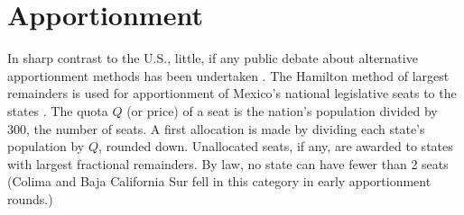 \documentclass[letter,12pt]{article}
\begin{document}
\section{Apportionment}

In sharp contrast to the U.S., little, if any public debate about alternative apportionment methods has been undertaken \citep{szpiro.numbersRule.2010,balinski.rodriguez.1996}. The Hamilton method of largest remainders is used for apportionment of Mexico's national legislative seats to the states \citep[][:10]{balinskiYoung2001FairRep}. The quota $Q$ (or price) of a seat is the nation's population divided by 300, the number of seats. A first allocation is made by dividing each state's population by $Q$, rounded down. Unallocated seats, if any, are awarded to states with largest fractional remainders. By law, no state can have fewer than 2 seats (Colima and Baja California Sur fell in this category in early apportionment rounds.) 
\end{document}
